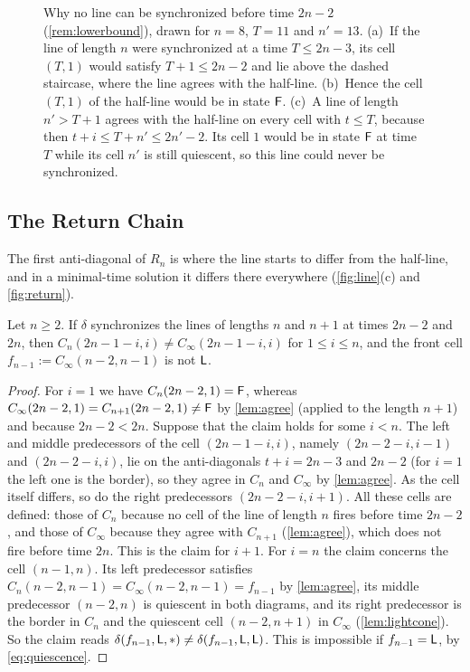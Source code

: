 \begin{figure}[t]
\centering

\caption{Why no line can be synchronized before time $2n-2$
(\cref{rem:lowerbound}), drawn for $n=8$, $T=11$ and $n'=13$. (a)~If the line
of length $n$ were synchronized at a time $T\le 2n-3$, its cell $(T,1)$ would
satisfy $T+1\le2n-2$ and lie above the dashed staircase, where the line agrees
with the half-line. (b)~Hence the cell $(T,1)$ of the half-line would be in
state $\mathsf F$. (c)~A line of length $n'>T+1$ agrees with the half-line on every
cell with $t\le T$, because then $t+i\le T+n'\le 2n'-2$. Its cell $1$ would be
in state $\mathsf F$ at time $T$ while its cell $n'$ is still quiescent, so this line
could never be synchronized.}
\label{fig:lowerbound}
\end{figure}

\subsection{The Return Chain}

The first anti-diagonal of $R_n$ is where the line starts to differ from the
half-line, and in a minimal-time solution it differs there everywhere
(\cref{fig:line}(c) and \cref{fig:return}).

\begin{lemma}\label{lem:return}
Let $n\ge2$. If $\delta$ synchronizes the lines of lengths $n$ and $n+1$ at
times $2n-2$ and $2n$, then $C_n(2n-1-i,i)\ne C_\infty(2n-1-i,i)$ for $1\le i\le
n$, and the front cell $f_{n-1}:=C_\infty(n-2,n-1)$ is not $\mathsf L$.
\end{lemma}

\begin{proof}
For $i=1$ we have $C_n(2n-2,1)=\mathsf F$, whereas
$C_\infty(2n-2,1)=C_{n+1}(2n-2,1)\ne\mathsf F$ by \cref{lem:agree} (applied to the
length $n+1$) and because $2n-2<2n$. Suppose that the claim holds for some
$i<n$. The left and middle predecessors of the cell $(2n-1-i,i)$, namely
$(2n-2-i,i-1)$ and $(2n-2-i,i)$, lie on the anti-diagonals $t+i=2n-3$ and
$2n-2$ (for $i=1$ the left one is the border), so they agree in $C_n$ and
$C_\infty$ by \cref{lem:agree}. As the cell itself differs, so do the right
predecessors $(2n-2-i,i+1)$. All these cells are defined: those of $C_n$
because no cell of the line of length $n$ fires before time $2n-2$, and those of
$C_\infty$ because they agree with $C_{n+1}$ (\cref{lem:agree}), which does not
fire before time $2n$. This is the claim for $i+1$. For
$i=n$ the claim concerns the cell $(n-1,n)$. Its left predecessor satisfies
$C_n(n-2,n-1)=C_\infty(n-2,n-1)=f_{n-1}$ by \cref{lem:agree}, its middle
predecessor $(n-2,n)$ is quiescent in both diagrams, and its right predecessor
is the border in $C_n$ and the quiescent cell $(n-2,n+1)$ in $C_\infty$
(\cref{lem:lightcone}). So the claim reads
$\delta(f_{n-1},\mathsf L,\ast)\ne\delta(f_{n-1},\mathsf L,\mathsf L)$. This is impossible
if $f_{n-1}=\mathsf L$, by \eqref{eq:quiescence}.
\end{proof}

